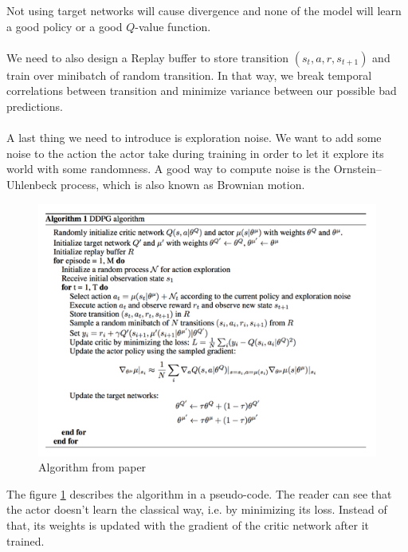 \documentclass{article}
\begin{document}
Not using target networks will cause divergence and none of the model will learn
a good policy or a good $Q$-value function.
\paragraph{}
We need to also design a Replay buffer to store transition $(s_t, a, r,
s_{t+1})$ and train over minibatch of random transition. In that way, we break
temporal correlations between transition and minimize variance between our
possible bad predictions.
\paragraph{}
A last thing we need to introduce is exploration noise. We want to add some noise to the
action the actor take during training in order to let it explore its world with
some randomness. A good way to compute noise is the Ornstein–Uhlenbeck process,
which is also known as Brownian motion. 

\begin{figure}[ht]
  \centering
  \includegraphics[width=\textwidth]{algoDDPG}
  \caption{Algorithm from \citeauthor{journals/corr/LillicrapHPHETS15} paper}
  \label{fig:algoDDPG}
\end{figure}

The figure \ref{fig:algoDDPG} describes the algorithm in a pseudo-code. The
reader can see that the actor doesn't learn the classical way, i.e. by
minimizing its loss. Instead of that, its weights is updated with the gradient
of the critic network after it trained. 
\end{document}
